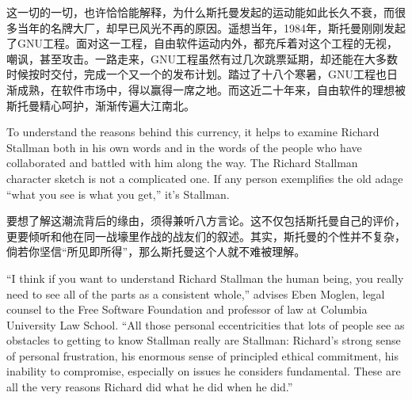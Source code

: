 \ifdefined\chs
这一切的一切，也许恰恰能解释，为什么斯托曼发起的运动能如此长久不衰，而很多当年的名牌大厂，却早已风光不再的原因。遥想当年，1984年，斯托曼刚刚发起了GNU工程。面对这一工程，自由软件运动内外，都充斥着对这个工程的无视，嘲讽，甚至攻击。一路走来，GNU工程虽然有过几次跳票延期，却还能在大多数时候按时交付，完成一个又一个的发布计划。踏过了十八个寒暑，GNU工程也日渐成熟，在软件市场中，得以赢得一席之地。而这近二十年来，自由软件的理想被斯托曼精心呵护，渐渐传遍大江南北。
\fi

\ifdefined\eng
To understand the reasons behind this currency, it helps to examine Richard Stallman both in his own words and in the words of the people who have collaborated and battled with him along the way. The Richard Stallman character sketch is not a complicated one. If any person exemplifies the old adage ``what you see is what you get,'' it's Stallman.
\fi

\ifdefined\chs
要想了解这潮流背后的缘由，须得兼听八方言论。这不仅包括斯托曼自己的评价，更要倾听和他在同一战壕里作战的战友们的叙述。其实，斯托曼的个性并不复杂，倘若你坚信``所见即所得''，那么斯托曼这个人就不难被理解。
\fi

\ifdefined\eng
``I think if you want to understand Richard Stallman the human being, you really need to see all of the parts as a consistent whole,'' advises Eben Moglen, legal counsel to the Free Software Foundation and professor of law at Columbia University Law School. ``All those personal eccentricities that lots of people see as obstacles to getting to know Stallman really are Stallman: Richard's strong sense of personal frustration, his enormous sense of principled ethical commitment, his inability to compromise, especially on issues he considers fundamental. These are all the very reasons Richard did what he did when he did.''
\fi

